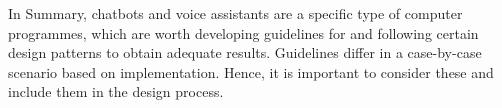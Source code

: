 In Summary, chatbots and voice assistants are a specific type of computer programmes, which are worth developing guidelines for and following certain design patterns to obtain adequate results. Guidelines differ in a case-by-case scenario based on implementation. Hence, it is important to consider these and include them in the design process.
